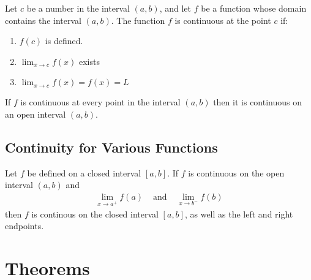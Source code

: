 \documentclass{article}
\begin{document}
\begin{definition}\label{def:continuity}
    Let $c$ be a number in the interval $(a,b)$, and let $f$ be a function whose domain
    contains the interval $(a,b)$. The function $f$ is continuous at the point $c$ if:
    \begin{enumerate}
        \item $f(c)$ is defined.
        \item $\lim_{x \to c} f(x)$ exists
        \item $\lim_{x \to c} f(x) = f(x) = L$
    \end{enumerate}
    If $f$ is continuous at every point in the interval $(a,b)$ then it is continuous on
    an open interval $(a,b)$.
\end{definition}

\subsection{Continuity for Various Functions}



\begin{definition}\label{def:continuity-closed-int}
    Let $f$ be defined on a closed interval $[a,b]$.
    If $f$ is continuous on the open interval $(a,b)$ and
    \begin{equation*}
        \begin{aligned}
            \lim_{x \to a^+} f(a) & \text{ and } & \lim_{x \to b^-} f(b)
        \end{aligned}
    \end{equation*}
    then $f$ is continous on the closed interval $[a,b]$,
    as well as the left and right endpoints.
\end{definition}




\section{Theorems}
\end{document}
